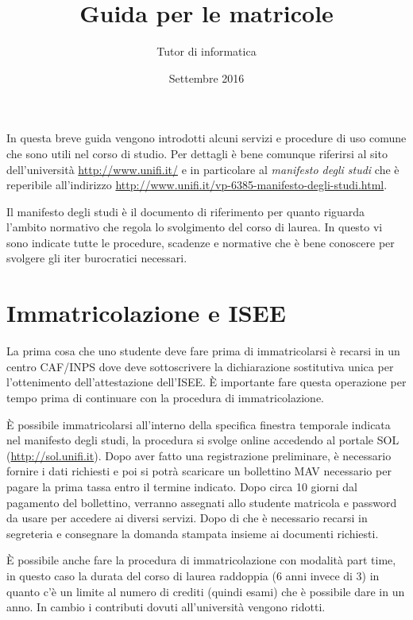 \documentclass[11pt,a4paper]{article}
\begin{document}
\title{Guida per le matricole}
\author{Tutor di informatica}
\date{Settembre 2016}
\maketitle


In questa breve guida vengono introdotti alcuni servizi e procedure di uso 
comune che sono utili nel corso di studio. Per dettagli è bene
comunque riferirsi al sito dell'università \url{http://www.unifi.it/}
e in particolare al \emph{manifesto degli studi} che è reperibile
all'indirizzo
\url{http://www.unifi.it/vp-6385-manifesto-degli-studi.html}.

Il manifesto degli studi è il documento di riferimento per quanto
riguarda l'ambito normativo che regola lo svolgimento del corso di
laurea. In questo vi sono indicate tutte le procedure, scadenze e
normative che è bene conoscere per svolgere gli iter burocratici
necessari.

\section{Immatricolazione e \acs{ISEE}}
La prima cosa che uno studente deve fare prima di immatricolarsi è
recarsi in un centro CAF/INPS dove deve sottoscrivere la dichiarazione
sostitutiva unica per l'ottenimento dell'attestazione
dell'\ac{ISEE}. È importante fare questa operazione per tempo prima di
continuare con la procedura di immatricolazione.

È possibile immatricolarsi all'interno della specifica
finestra temporale indicata nel manifesto degli studi, la procedura si
svolge online accedendo al portale \ac{SOL}
(\url{http://sol.unifi.it}). Dopo aver fatto una 
registrazione preliminare, è necessario fornire i dati richiesti
e poi si potrà scaricare un bollettino MAV necessario per pagare la
prima tassa entro il termine indicato. Dopo circa 10 giorni dal
pagamento del bollettino, verranno assegnati allo studente matricola e
password da usare per accedere ai diversi servizi. Dopo di che è
necessario recarsi in segreteria e consegnare la domanda stampata
insieme ai documenti richiesti.

È possibile anche fare la procedura di immatricolazione con modalità
part time, in questo caso la durata del corso di laurea raddoppia (6
anni invece di 3) in quanto c'è un limite al numero di crediti (quindi
esami) che è
possibile dare in un anno. In cambio i contributi dovuti
all'università vengono ridotti.
\end{document}
